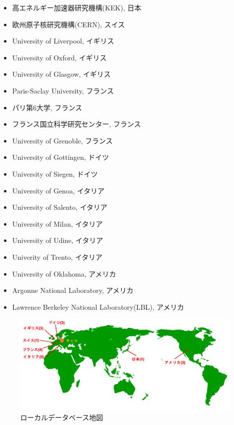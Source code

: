 \begin{itemize}
  \item 高エネルギー加速器研究機構(KEK), 日本
  \item 欧州原子核研究機構(CERN), スイス
  \item University of Liverpool, イギリス
  \item University of Oxford, イギリス
  \item University of Glasgow, イギリス
  \item Paris-Saclay University, フランス
  \item パリ第6大学, フランス
  \item フランス国立科学研究センター, フランス
  \item University of Grenoble, フランス
  \item University of Gottingen, ドイツ
  \item University of Siegen, ドイツ
  \item University of Genoa, イタリア
  \item University of Salento, イタリア
  \item University of Milan, イタリア
  \item University of Udine, イタリア
  \item Univerity of Trento, イタリア
  \item University of Oklahoma, アメリカ
  \item Argonne National Laboratory, アメリカ
  \item Lawrence Berkeley National Laboratory(LBL), アメリカ
\end{itemize}

\begin{figure}[bpt]\centering
\includegraphics[width=14cm]{localdb_world_map}
\caption[ローカルデータベース地図]{ローカルデータベース地図}
\label{localdb_world_map}
\end{figure}

\newpage

